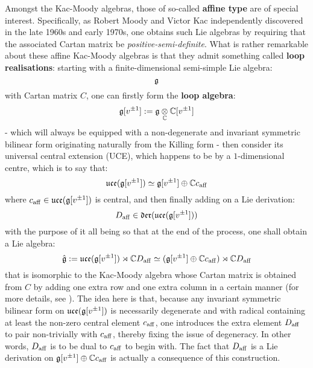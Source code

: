         Amongst the Kac-Moody algebras, those of so-called \textbf{affine type} are of special interest. Specifically, as Robert Moody and Victor Kac independently discovered in the late 1960s and early 1970s, one obtains such Lie algebras by requiring that the associated Cartan matrix be \textit{positive-semi-definite}. What is rather remarkable about these affine Kac-Moody algebras is that they admit something called \textbf{loop realisations}: starting with a finite-dimensional semi-simple Lie algebra:
            $$\mathfrak{g}$$
        with Cartan matrix $C$, one can firstly form the \textbf{loop algebra}:
            $$\g[v^{\pm 1}] := \g \tensor_{\bbC} \bbC[v^{\pm 1}]$$
        - which will always be equipped with a non-degenerate and invariant symmetric bilinear form originating naturally from the Killing form - then consider its universal central extension (UCE), which happens to be by a $1$-dimensional centre, which is to say that:
            $$\mathfrak{uce}(\mathfrak{g}[v^{\pm 1}]) \simeq \mathfrak{g}[v^{\pm 1}] \oplus \mathbb{C} c_{\mathrm{aff}}$$
        where $c_{\mathrm{aff}} \in \mathfrak{uce}(\mathfrak{g}[v^{\pm 1}])$ is central, and then finally adding on a Lie derivation:
            $$D_{\mathrm{aff}} \in \mathfrak{der}( \mathfrak{uce}(\mathfrak{g}[v^{\pm 1}]) )$$
        with the purpose of it all being so that at the end of the process, one shall obtain a Lie algebra:
            $$\hat{\mathfrak{g}} := \mathfrak{uce}(\mathfrak{g}[v^{\pm 1}]) \rtimes \mathbb{C} D_{\mathrm{aff}} \simeq (\mathfrak{g}[v^{\pm 1}] \oplus \mathbb{C} c_{\mathrm{aff}}) \rtimes \mathbb{C} D_{\mathrm{aff}}$$
        that is isomorphic to the Kac-Moody algebra whose Cartan matrix is obtained from $C$ by adding one extra row and one extra column in a certain manner (for more details, see \cite[Chapter 7]{kac_infinite_dimensional_lie_algebras}). The idea here is that, because any invariant symmetric bilinear form on $\mathfrak{uce}(\mathfrak{g}[v^{\pm 1}])$ is necessarily degenerate and with radical containing at least the non-zero central element $c_{\mathrm{aff}}$, one introduces the extra element $D_{\mathrm{aff}}$ to pair non-trivially with $c_{\mathrm{aff}}$, thereby fixing the issue of degeneracy. In other words, $D_{\mathrm{aff}}$ is to be dual to $c_{\mathrm{aff}}$ to begin with. The fact that $D_{\mathrm{aff}}$ is a Lie derivation on $\mathfrak{g}[v^{\pm 1}] \oplus \mathbb{C} c_{\mathrm{aff}}$ is actually a consequence of this construction.

